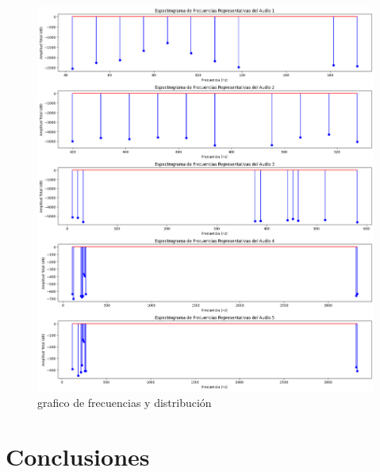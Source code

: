 \begin{figure}[!h]
	\centering
	\includegraphics[width=15cm]{Images/Frecuencias_representativas}
	\caption{grafico de frecuencias y distribución}
	\label{fig:FyD}
\end{figure}



\chapter{Conclusiones}

